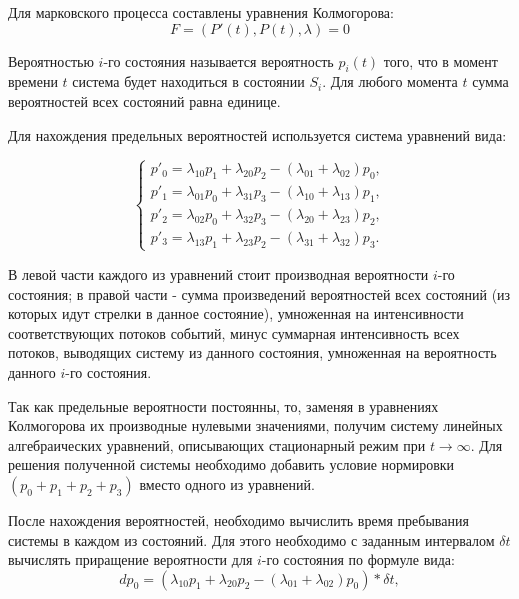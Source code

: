\documentclass[12pt]{report}
\begin{document}
Для марковского процесса составлены уравнения Колмогорова:
$$F=(P'(t), P(t), \lambda)=0$$


Вероятностью $i$-го состояния называется вероятность $p_i(t)$ того, что в момент времени $t$ система будет находиться в состоянии $S_i$. Для любого момента $t$ сумма вероятностей всех состояний равна единице. 

Для нахождения предельных вероятностей используется система уравнений вида:

\begin{equation*}
 \begin{cases}
   p'_0 = \lambda_{10}p_1 + \lambda_{20}p_2 - (\lambda_{01} + \lambda_{02})p_0,
   \\
  p'_1 = \lambda_{01}p_0 + \lambda_{31}p_3 - (\lambda_{10} + \lambda_{13})p_1,
   \\
  p'_2 = \lambda_{02}p_0 + \lambda_{32}p_3 - (\lambda_{20} + \lambda_{23})p_2,
  \\
  p'_3 = \lambda_{13}p_1 + \lambda_{23}p_2 - (\lambda_{31} + \lambda_{32})p_3.
 \end{cases}
\end{equation*}
\newline


В левой части каждого из уравнений стоит производная вероятности $i$-го состояния; в правой части - сумма произведений вероятностей всех состояний (из которых идут стрелки в данное состояние), умноженная на интенсивности соответствующих потоков событий, минус суммарная интенсивность всех потоков, выводящих систему из данного состояния, умноженная на вероятность данного $i$-го состояния.
\newline


Так как предельные вероятности постоянны, то, заменяя в уравнениях Колмогорова их производные нулевыми значениями, получим систему линейных алгебраических уравнений, описывающих стационарный режим при $t \rightarrow \infty$.
Для решения полученной системы необходимо добавить условие нормировки $(p_0 + p_1 + p_2 + p_3)$ вместо одного из уравнений.
\newline


После нахождения вероятностей, необходимо вычислить время пребывания системы в каждом из состояний. Для этого необходимо с заданным интервалом $\delta t$ вычислять приращение вероятности для $i$-го состояния по формуле вида:
\begin{equation*}
   dp_0 = (\lambda_{10}p_1 + \lambda_{20}p_2 - (\lambda_{01} + \lambda_{02})p_0) * \delta t,
\end{equation*}
\end{document}
